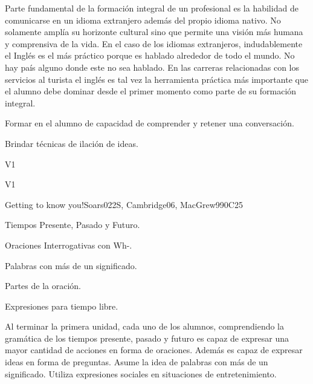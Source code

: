 \begin{syllabus}


\begin{justification}
Parte fundamental de la formación integral de un profesional es la habilidad de comunicarse en un idioma extranjero además del propio idioma nativo. No solamente amplía su horizonte cultural sino que permite una visión más humana y comprensiva de la vida. En el caso de los idiomas extranjeros, indudablemente el Inglés es el 
más práctico porque es hablado alrededor de todo el mundo. No hay país alguno donde este no sea hablado. En las carreras relacionadas con los servicios al turista el inglés es tal vez la herramienta práctica más importante que el alumno debe dominar desde el primer momento como parte de su formación integral.
\end{justification}

\begin{goals}
\item Formar en el alumno de capacidad de comprender y retener una conversación.
\item Brindar técnicas de ilación de ideas.
\end{goals}

\begin{outcomes}{V1}
\item {}
\end{outcomes}

\begin{competences}{V1}
\item {}
\end{competences}

\begin{unit}{Getting to know you!}{}{Soars022S, Cambridge06, MacGrew99}{0}{C25}
   \begin{topics}
      \item Tiempos Presente, Pasado y Futuro.
      \item Oraciones Interrogativas con Wh-.
      \item Palabras con más de un significado.
      \item Partes de la oración.
      \item Expresiones para tiempo libre.
   \end{topics}

   \begin{learningoutcomes}
      \item Al terminar la primera unidad, cada uno de los alumnos, comprendiendo la gramática de los tiempos presente, pasado y futuro es capaz de expresar una mayor cantidad de acciones en forma de oraciones.  Además es capaz de expresar ideas en forma de preguntas.  Asume la idea de palabras con más de un significado. Utiliza expresiones sociales en situaciones de entretenimiento. 
   \end{learningoutcomes}
\end{unit}


\end{syllabus}
